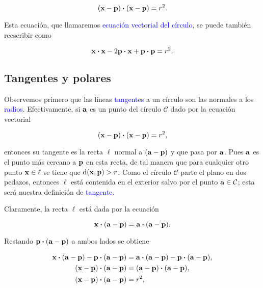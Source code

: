 \documentclass{article}
\theoremstyle{definicion}
\theoremstyle{definition}             %
\theoremstyle{definition}             %
\theoremstyle{definition}
\theoremstyle{definition}
\theoremstyle{observacion}
\theoremstyle{definition}
\theoremstyle{plain}
\theoremstyle{definition}
\theoremstyle{afirmacion}
\theoremstyle{notation}
\theoremstyle{definition}
\begin{document}
    \begin{equation*}
        (\vb{x} - \vb{p}) \vdot (\vb{x} - \vb{p}) = r^{2}.
    \end{equation*}

    Esta ecuación, que llamaremos \textcolor{blue}{ecuación vectorial del círculo}, se puede también reescribir como

    \begin{equation*}
        \vb{x} \vdot \vb{x} - 2\vb{p} \vdot \vb{x} + \vb{p} \vdot \vb{p} = r^{2}.
    \end{equation*}

    \subsection{Tangentes y polares}

    Observemos primero que las líneas \textcolor{blue}{tangentes} a un círculo son las normales a los \textcolor{blue}{radios}. Efectivamente, si \(\vb{a}\) es un punto del círculo \(\mathcal{C}\) dado por la ecuación vectorial

    \begin{equation*}
        (\vb{x} - \vb{p}) \vdot (\vb{x} - \vb{p}) = r^{2},
    \end{equation*}

    entonces su tangente es la recta \(\ell\) normal a \((\vb{a} - \vb{p})\) y que pasa por \(\vb{a}\). Pues \(\vb{a}\) es el punto más cercano a \(\vb{p}\) en esta recta, de tal manera que para cualquier otro punto \(\vb{x} \in \ell\) se tiene que \(\textrm{d}(\vb{x}, \vb{p}) > r\). Como el círculo \(\mathcal{C}\) parte el plano en dos pedazos, entonces \(\ell\) está contenida en el exterior salvo por el punto \(\vb{a} \in \mathcal{C}\); esta será nuestra definición de \textcolor{blue}{tangente}.

    Claramente, la recta \(\ell\) está dada por la ecuación

    \begin{equation*}
        \vb{x} \vdot (\vb{a} - \vb{p}) = \vb{a} \vdot (\vb{a} - \vb{p}).
    \end{equation*}

    Restando \(\vb{p} \vdot (\vb{a} - \vb{p})\) a ambos lados se obtiene

    \begin{align*}
        \vb{x} \vdot (\vb{a} - \vb{p}) - \vb{p} \vdot (\vb{a} - \vb{p}) &= \vb{a} \vdot (\vb{a} - \vb{p}) - \vb{p} \vdot (\vb{a} - \vb{p}),\\
        (\vb{x} - \vb{p}) \vdot (\vb{a} - \vb{p}) &= (\vb{a} - \vb{p}) \vdot (\vb{a} - \vb{p}),\\
        (\vb{x} - \vb{p}) \vdot (\vb{a} - \vb{p}) &= r^{2},
    \end{align*}
\end{document}
